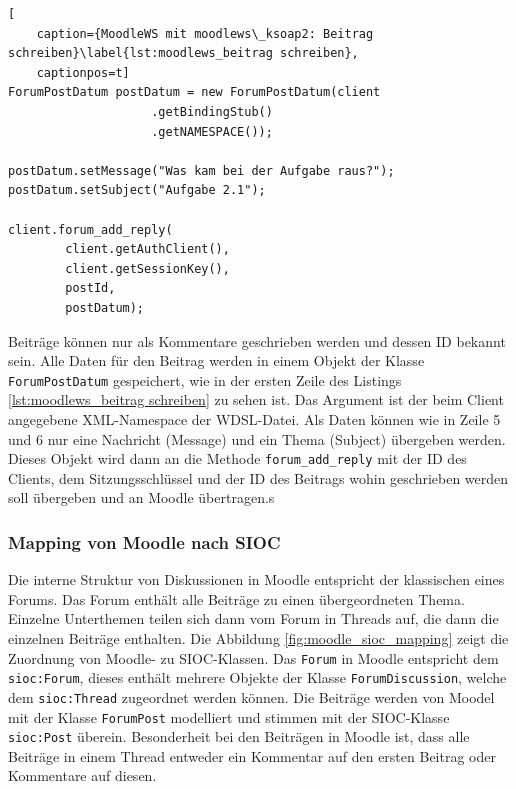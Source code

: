 \begin{lstlisting}[
    caption={MoodleWS mit moodlews\_ksoap2: Beitrag schreiben}\label{lst:moodlews_beitrag schreiben},
    captionpos=t]
ForumPostDatum postDatum = new ForumPostDatum(client
                    .getBindingStub()
                    .getNAMESPACE());

postDatum.setMessage("Was kam bei der Aufgabe raus?");
postDatum.setSubject("Aufgabe 2.1");

client.forum_add_reply(
        client.getAuthClient(),
        client.getSessionKey(),
        postId,
        postDatum);
\end{lstlisting}

Beiträge können nur als Kommentare geschrieben werden und dessen ID bekannt sein. Alle Daten für den Beitrag werden in einem Objekt der Klasse \texttt{ForumPostDatum} gespeichert, wie in der ersten Zeile des Listings \ref{lst:moodlews_beitrag schreiben} zu sehen ist. Das Argument ist der beim Client angegebene XML-Namespace der WDSL-Datei. Als Daten können wie in Zeile 5 und 6 nur eine Nachricht (Message) und ein Thema (Subject) übergeben werden. Dieses Objekt wird dann an die Methode \texttt{forum\_add\_reply} mit der ID des Clients, dem Sitzungsschlüssel und der ID des Beitrags wohin geschrieben werden soll übergeben und an Moodle übertragen.s


\subsubsection{Mapping von Moodle nach SIOC} %
\label{ssub:moodle_mapping_nach_sioc}

Die interne Struktur von Diskussionen in Moodle entspricht der klassischen eines Forums. Das Forum enthält alle Beiträge zu einen übergeordneten Thema. Einzelne Unterthemen teilen sich dann vom Forum in Threads auf, die dann die einzelnen Beiträge enthalten. Die Abbildung \ref{fig:moodle_sioc_mapping} zeigt die Zuordnung von Moodle- zu SIOC-Klassen. Das \texttt{Forum} in Moodle entspricht dem \texttt{sioc:Forum}, dieses enthält mehrere Objekte der Klasse \texttt{ForumDiscussion}, welche dem \texttt{sioc:Thread} zugeordnet werden können. Die Beiträge werden von Moodel mit der Klasse \texttt{ForumPost} modelliert und stimmen mit der SIOC-Klasse \texttt{sioc:Post} überein. Besonderheit bei den Beiträgen in Moodle ist, dass alle Beiträge in einem Thread entweder ein Kommentar auf den ersten Beitrag oder Kommentare auf diesen. 

